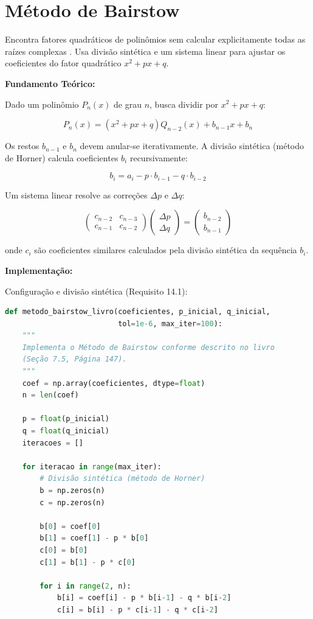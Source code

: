 \documentclass[
	12pt,				%
	openright,			%
	oneside,			%
	a4paper,			%
	english,			%
	brazil				%
	]{abntex2}
\begin{document}
\vspace{0.5cm}

\section{Método de Bairstow}

Encontra fatores quadráticos de polinômios sem calcular explicitamente todas as raízes complexas \cite{bairstow1920}. Usa divisão sintética e um sistema linear para ajustar os coeficientes do fator quadrático $x^2 + px + q$.

\textbf{Fundamento Teórico:}

Dado um polinômio $P_n(x)$ de grau $n$, busca dividir por $x^2 + px + q$:

$$P_n(x) = (x^2 + px + q) Q_{n-2}(x) + b_{n-1} x + b_n$$

Os restos $b_{n-1}$ e $b_n$ devem anular-se iterativamente. A divisão sintética (método de Horner) calcula coeficientes $b_i$ recursivamente:

$$b_i = a_i - p \cdot b_{i-1} - q \cdot b_{i-2}$$

Um sistema linear resolve as correções $\Delta p$ e $\Delta q$:

$$\begin{pmatrix} c_{n-2} & c_{n-3} \\ c_{n-1} & c_{n-2} \end{pmatrix} \begin{pmatrix} \Delta p \\ \Delta q \end{pmatrix} = \begin{pmatrix} b_{n-2} \\ b_{n-1} \end{pmatrix}$$

onde $c_i$ são coeficientes similares calculados pela divisão sintética da sequência $b_i$.

\vspace{0.3cm}

\textbf{Implementação:}

Configuração e divisão sintética (Requisito 14.1):

\begin{lstlisting}[language=Python, caption={Requisito 14.1 - Divisão Sintética}]
def metodo_bairstow_livro(coeficientes, p_inicial, q_inicial, 
                          tol=1e-6, max_iter=100):
    """
    Implementa o Método de Bairstow conforme descrito no livro
    (Seção 7.5, Página 147).
    """
    coef = np.array(coeficientes, dtype=float)
    n = len(coef)
    
    p = float(p_inicial)
    q = float(q_inicial)
    iteracoes = []
    
    for iteracao in range(max_iter):
        # Divisão sintética (método de Horner)
        b = np.zeros(n)
        c = np.zeros(n)
        
        b[0] = coef[0]
        b[1] = coef[1] - p * b[0]
        c[0] = b[0]
        c[1] = b[1] - p * c[0]
        
        for i in range(2, n):
            b[i] = coef[i] - p * b[i-1] - q * b[i-2]
            c[i] = b[i] - p * c[i-1] - q * c[i-2]
\end{lstlisting}
\end{document}
